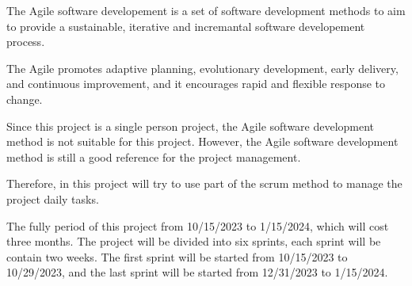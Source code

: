 The Agile software developement is a set of software development methods
to aim to provide a sustainable, iterative and incremantal software developement
process.

The Agile promotes adaptive planning, evolutionary development, early delivery,
and continuous improvement, and it encourages rapid 
and flexible response to change.

Since this project is a single person project, the Agile software development
method is not suitable for this project. However, the Agile software development
method is still a good reference for the project management.

Therefore, in this project will try to use part of the scrum method to manage
the project daily tasks.

The fully period of this project from 10/15/2023 to 1/15/2024, which will cost 
three months. The project will be divided into six sprints, each sprint will
be contain two weeks. The first sprint will be started 
from 10/15/2023 to 10/29/2023,
and the last sprint will be started from 12/31/2023 to 1/15/2024. 


